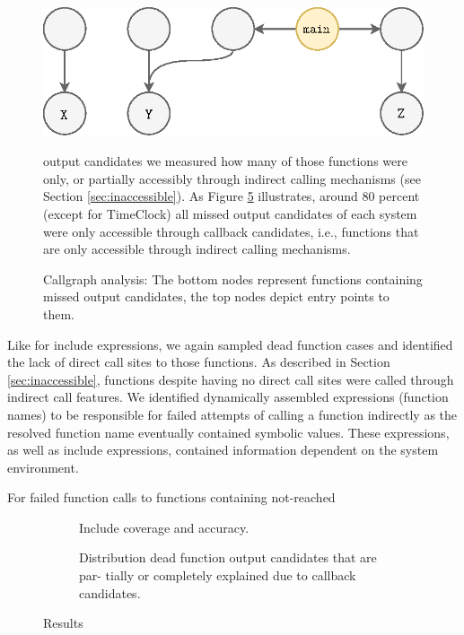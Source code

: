 \documentclass[preprint]{sig-alternate-05-2015}
\begin{document}
\begin{figure}[t!]
	\includegraphics[scale=0.55]{images-paper/callgraph_cases}
    \caption{Callgraph analysis: The bottom nodes represent functions containing missed output candidates, the top nodes depict entry points to them.}
    \label{fig:callgraph} output candidates we measured how many of those functions were only, or partially accessibly through indirect calling mechanisms (see Section \ref{sec:inaccessible}). As Figure \ref{fig:output_candidate_explanation} illustrates, around 80 percent (except for \textsf{TimeClock}) all missed output candidates of each system were only accessible through callback candidates, i.e., functions that are only accessible through indirect calling mechanisms.
	
\end{figure}

Like for include expressions, we again sampled dead function cases and
identified the lack of direct call sites to those functions. As described in
Section \ref{sec:inaccessible}, functions despite having no direct call sites
were called through indirect call features. We identified dynamically assembled
expressions (function names) to be responsible for failed attempts of calling a
function indirectly as the resolved function name eventually contained symbolic
values. These expressions, as well as include expressions, contained
information dependent on the system environment.

For failed function calls to functions containing not-reached
	
	
\begin{figure}[h!]
	\begin{subfigure}[center]{0.48\textwidth}
		
		\caption{\label{coverage}}
	\end{subfigure}
	
	\begin{subfigure}[center]{0.48\textwidth}
		
		\caption{
			Include coverage and accuracy.
			\label{fig:include_coverage_results}
		}
	\end{subfigure}
	
	
	\begin{subfigure}[center]{0.48\textwidth}
		
		\caption{
			Distribution dead function output candidates that are par-
			tially or completely explained due to callback candidates.
			\label{fig:output_candidate_explanation}
		}
		
	\end{subfigure}
	\caption{Results}
\end{figure}
\end{document}
